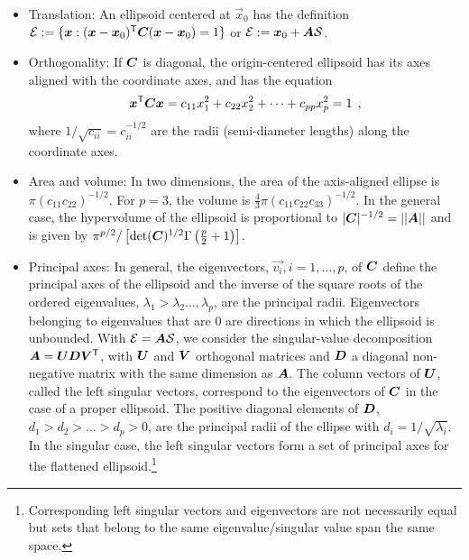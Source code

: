\begin{itemize}
 \item Translation: An ellipsoid centered at $\vec{x}_0$ has the definition $\mathcal{E} := \{ \bm{x}: (\bm{x}-\bm{x}_0)^\mathsf{T} \bm{C} (\bm{x}-\bm{x}_0) =1
 \}$ or $\mathcal{E} := \bm{x}_0 +\bm{A} \mathcal{S}$.

 \item Orthogonality: If $\bm{C}$ is diagonal, the origin-centered ellipsoid has its axes aligned with the coordinate axes, and
has the equation
\begin{equation}\label{eq:ellisoid2}
 \bm{x}^\mathsf{T} \bm{C} \bm{x} = c_{11} x_1^2 + c_{22} x_2^2 + \cdots + c_{pp} x_p^2 =1 \:\: ,
\end{equation}
where $1/\sqrt{c_{ii}} = c_{ii}^{-1/2}$ are the radii (semi-diameter lengths) along the coordinate axes.

 \item Area and volume: In two dimensions, the area of the axis-aligned ellipse is $\pi (c_{11} c_{22})^{-1/2}$.
 For $p=3$, the volume is $\frac{4}{3}\pi (c_{11} c_{22} c_{33})^{-1/2}$.
 In the general case, the hypervolume of the ellipsoid is proportional to $|\bm{C}|^{-1/2}=||\bm{A}||$
 and is given by $\pi^{p/2} / \left[ \mathrm{det} (\bm{C})^{1/2} \Gamma\left(\frac{p}{2}+1\right) \right]$.

 \item Principal axes: In general, the eigenvectors, $\vec{v_i}, i=1,\dots,p$,
of $\bm{C}$ define the principal axes of the ellipsoid and
the inverse of the square roots of the ordered
eigenvalues, $\lambda_1 > \lambda_2 \dots, \lambda_p$, are the principal radii.
Eigenvectors belonging to eigenvalues that are 0 are directions in which the ellipsoid is unbounded.
With $\mathcal{E} = \bm{A} \mathcal{S}$, we consider the singular-value decomposition
$  \bm{A}= \bm{U} \bm{D} \bm{V} ^\mathsf{T}$,
with $\bm{U}$ and  $\bm{V}$ orthogonal matrices and  $\bm{D}$  a diagonal non-negative matrix
with the same dimension as $\bm{A}$.
The column vectors of $\bm{U}$, called the left singular vectors,
correspond to the eigenvectors of $\bm{C}$ in the case of a proper ellipsoid.
The positive diagonal elements of $\bm{D}$, $d_1 > d_2 > ... > d_p>0$,
are the principal radii of the ellipse with $d_i = 1/\sqrt{\lambda_i}$.
In the singular case, the left singular vectors form a set of principal axes for the flattened ellipsoid.\footnote{Corresponding left singular vectors and eigenvectors are not necessarily equal but sets that belong to the same eigenvalue/singular value span the same space.}


\end{itemize}
